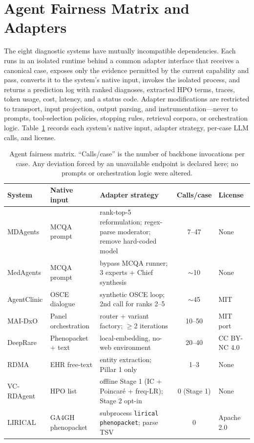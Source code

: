 \documentclass[letterpaper]{article} %
\begin{document}
\section{Agent Fairness Matrix and Adapters}
\label{app:fairness}

The eight diagnostic systems have mutually incompatible dependencies. Each runs
in an isolated runtime behind a common adapter interface that receives a
canonical case, exposes only the evidence permitted by the current capability
and pass, converts it to the system's native input, invokes the isolated
process, and returns a prediction log with ranked diagnoses, extracted HPO
terms, traces, token usage, cost, latency, and a status code. Adapter
modifications are restricted to transport, input projection, output parsing, and
instrumentation---never to prompts, tool-selection policies, stopping rules,
retrieval corpora, or orchestration logic. Table~\ref{tab:fairness} records each
system's native input, adapter strategy, per-case LLM calls, and license.

\begin{table}[t]
\centering
\scriptsize
\setlength{\tabcolsep}{4pt}
\caption{Agent fairness matrix. ``Calls/case'' is the number of backbone
invocations per case. Any deviation forced by an unavailable endpoint is
declared here; no prompts or orchestration logic were altered.}
\label{tab:fairness}
\begin{tabular}{@{}lllcl@{}}
\toprule
System & Native input & Adapter strategy & Calls/case & License \\
\midrule
MDAgents & MCQA prompt & rank-top-5 reformulation; regex-parse moderator; remove hard-coded model & 7--47 & None \\
MedAgents & MCQA prompt & bypass MCQA runner; 3 experts + Chief synthesis & $\sim$10 & None \\
AgentClinic & OSCE dialogue & synthetic OSCE loop; 2nd call for ranks 2--5 & $\sim$45 & MIT \\
MAI-DxO & Panel orchestration & router + variant factory; $\geq$2 iterations & 10--50 & MIT port \\
DeepRare & Phenopacket + text & local-embedding, no-web environment & 20--40 & CC BY-NC 4.0 \\
RDMA & EHR free-text & entity extraction; Pillar 1 only & 1--3 & None \\
VC-RDAgent & HPO list & offline Stage 1 (IC + Poincar\'e + freq-LR); Stage 2 opt-in & 0 (Stage 1) & None \\
LIRICAL & GA4GH phenopacket & subprocess \texttt{lirical phenopacket}; parse TSV & 0 & Apache 2.0 \\
\bottomrule
\end{tabular}
\end{table}
\end{document}
